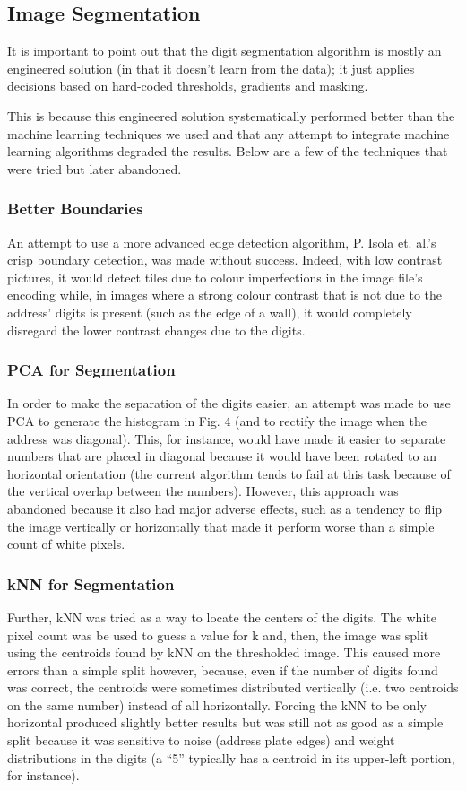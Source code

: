 \documentclass{article} %
\begin{document}
\subsection{Image Segmentation}

It is important to point out that the digit segmentation algorithm is mostly an engineered solution (in that it doesn’t learn from the data); it just applies decisions based on hard-coded thresholds, gradients and masking.

This is because this engineered solution systematically performed better than the machine learning techniques we used and that any attempt to integrate machine learning algorithms degraded the results. Below are a few of the techniques that were tried but later abandoned.

\subsubsection{Better Boundaries}
An attempt to use a more advanced edge detection algorithm, P. Isola et. al.’s crisp boundary detection\cite{isola2014crisp}, was made without success. Indeed, with low contrast pictures, it would detect tiles due to colour imperfections in the image file’s encoding while, in images where a strong colour contrast that is not due to the address’ digits is present (such as the edge of a wall), it would completely disregard the lower contrast changes due to the digits.

\subsubsection{PCA for Segmentation}
In order to make the separation of the digits easier, an attempt was made to use PCA to generate the histogram in Fig. 4 (and to rectify the image when the address was diagonal). This, for instance, would have made it easier to separate numbers that are placed in diagonal because it would have been rotated to an horizontal orientation (the current algorithm tends to fail at this task because of the vertical overlap between the numbers). However, this approach was abandoned because it also had major adverse effects, such as a tendency to flip the image vertically or horizontally that made it perform worse than a simple count of white pixels.

\subsubsection{kNN for Segmentation}
Further, kNN was tried as a way to locate the centers of the digits. The white pixel count was be used to guess a value for k and, then, the image was split using the centroids found by kNN on the thresholded image. This caused more errors than a simple split however, because, even if the number of digits found was correct, the centroids were sometimes distributed vertically (i.e. two centroids on the same number) instead of all horizontally. Forcing the kNN to be only horizontal produced slightly better results but was still not as good as a simple split because it was sensitive to noise (address plate edges) and weight distributions in the digits (a “5” typically has a centroid in its upper-left portion, for instance).
\end{document}
